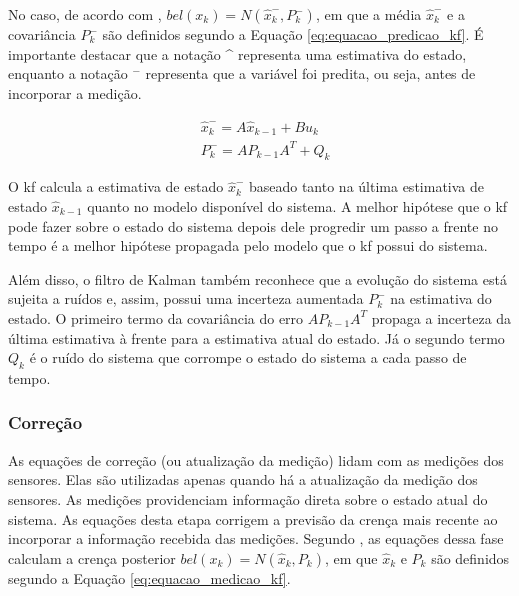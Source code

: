 \documentclass[acronym, symbols, table]{fei}
\begin{document}
				No caso, de acordo com \textcite{thrun2002probabilistic}, $bel(x_k) = N(\hat{x}_{k}^{-},P_{k}^{-})$, em que a média $\hat{x}_{k}^{-}$ e a covariância $P_{k}^{-}$ são definidos segundo a Equação \eqref{eq:equacao_predicao_kf}. É importante destacar que a notação \^{} representa uma estimativa do estado, enquanto a notação $^-$ representa que a variável foi predita, ou seja, antes de incorporar a medição.
				
				\begin{equation} \label{eq:equacao_predicao_kf}
					\begin{split}
						&\hat{x}_{k}^{-} = A\hat{x}_{k-1} + Bu_{k} \\
						&P_{k}^{-} = AP_{k-1}A^{T} + Q_{k}					
					\end{split}
				\end{equation}
			
				O \acrshort{kf} calcula a estimativa de estado $\hat{x}_{k}^{-}$ baseado tanto na última estimativa de estado $\hat{x}_{k-1}$ quanto no modelo disponível do sistema. A melhor hipótese que o \acrshort{kf} pode fazer sobre o estado do sistema depois dele progredir um passo a frente no tempo é a melhor hipótese propagada pelo modelo que o \acrshort{kf} possui do sistema.
				
				Além disso, o filtro de Kalman também reconhece que a evolução do sistema está sujeita a ruídos e, assim, possui uma incerteza aumentada $P_{k}^{-}$ na estimativa do estado. O primeiro termo da covariância do erro $AP_{k-1}A^{T}$ propaga a incerteza da última estimativa à frente para a estimativa atual do estado. Já o segundo termo $Q_{k}$ é o ruído do sistema que corrompe o estado do sistema a cada passo de tempo.
			
			\subsubsection{Correção}
			
				As equações de correção (ou atualização da medição) lidam com as medições dos sensores. Elas são utilizadas apenas quando há a atualização da medição dos sensores. As medições providenciam informação direta sobre o estado atual do sistema. As equações desta etapa corrigem a previsão da crença mais recente ao incorporar a informação recebida das medições. Segundo \textcite{thrun2002probabilistic}, as equações dessa fase calculam a crença posterior $bel(x_k) = N(\hat{x}_{k},P_{k})$, em que $\hat{x}_{k}$ e $P_{k}$ são definidos segundo a Equação \eqref{eq:equacao_medicao_kf}.
				
\end{document}
